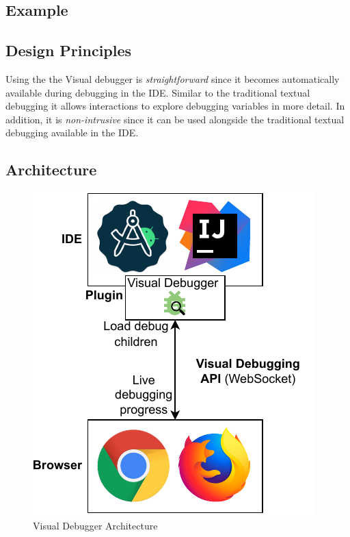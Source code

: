 \documentclass[sigconf]{acmart}
\begin{document}
\subsection{Example}

\subsection{Design Principles}
Using the the Visual debugger is \textit{straightforward} since it becomes automatically available during debugging in the IDE.
Similar to the traditional textual debugging it allows interactions to explore debugging variables in more detail.
In addition, it is \textit{non-intrusive} since it can be used alongside the traditional textual debugging available in the IDE.


\subsection{Architecture}

\begin{figure}[ht]
  \centering
  \includegraphics[width=0.7\linewidth]{images/visual-debugger.pdf}
  \caption{Visual Debugger Architecture}
\end{figure}
\end{document}
